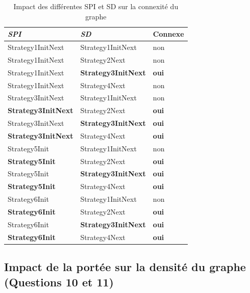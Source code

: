 \documentclass[a4paper]{article}
\begin{document}
\begin{minipage}{0.5\textwidth}
    \begin{table}[H]
\centering
    \begin{tabular}{| l | l | l |}
  \hline
  \textsl{SPI} & \textsl{SD} & \textbf{Connexe}\\
  \hline
  Strategy1InitNext & Strategy1InitNext & non\\
  \hline
  Strategy1InitNext & Strategy2Next &  non\\
  \hline
  Strategy1InitNext & \textbf{Strategy3InitNext} & \textbf{oui}\\
  \hline
  Strategy1InitNext & Strategy4Next & non \\
  \hline
  Strategy3InitNext & Strategy1InitNext & non \\
  \hline
  \textbf{Strategy3InitNext} & Strategy2Next & \textbf{oui} \\
  \hline
  Strategy3InitNext & \textbf{Strategy3InitNext} & \textbf{oui}\\
  \hline
  \textbf{Strategy3InitNext} & Strategy4Next & \textbf{oui}\\
  \hline
  Strategy5Init & Strategy1InitNext & non \\
  \hline
  \textbf{Strategy5Init} & Strategy2Next & \textbf{oui}\\
  \hline
  Strategy5Init & \textbf{Strategy3InitNext} & \textbf{oui} \\
  \hline
  \textbf{Strategy5Init} & Strategy4Next & \textbf{oui} \\
  \hline
  Strategy6Init & Strategy1InitNext & non\\
  \hline
  \textbf{Strategy6Init} & Strategy2Next & \textbf{oui} \\
  \hline
  Strategy6Init & \textbf{Strategy3InitNext} & \textbf{oui}\\
  \hline
  \textbf{Strategy6Init} & Strategy4Next & \textbf{oui}\\
  \hline
\end{tabular}
    \caption{Impact des différentes SPI et SD sur la connexité du graphe}
    \label{table:SPISDGraphe}
  \end{table}
\end{minipage}


\subsection{Impact de la portée sur la densité du graphe (Questions 10 et 11)}
\end{document}
